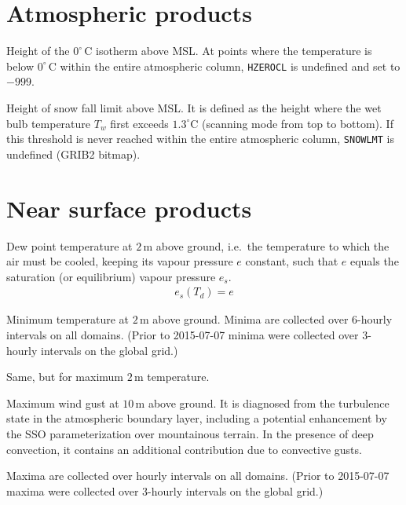 \section{Atmospheric products}
\begin{description}[leftmargin=3.0cm,style=sameline]
 \item [HZEROCL] Height of the $0^{\circ}\,\mathrm{C}$ isotherm above MSL. At points where the temperature is below 
                 $0^{\circ}\,\mathrm{C}$ within the entire atmospheric column, \texttt{HZEROCL} is undefined 
                 and set to $-999$.
 \item [SNOWLMT] Height of snow fall limit above MSL. It is defined as the height where the wet bulb 
                 temperature $T_{w}$ first exceeds $1.3^{\circ}\mathrm{C}$ (scanning mode from top to bottom). 
                 If this threshold is never reached within the entire atmospheric column, \texttt{SNOWLMT} 
                 is undefined (GRIB2 bitmap).
\end{description}


\section{Near surface products}
\begin{description}[leftmargin=3.0cm,style=sameline]
  \item[TD\_2M]     Dew point temperature at $2\,\mathrm{m}$ above ground, i.e.\ the temperature to which the 
                    air must be cooled, keeping its vapour pressure $e$ constant, such that $e$ equals the 
                    saturation (or equilibrium) vapour pressure $e_{s}$.
                    \begin{align*}
                      e_{s}(T_{d}) = e
                    \end{align*}
  \item [TMIN\_2M]  Minimum temperature at $2\,\mathrm{m}$ above ground. Minima are collected over $6$-hourly intervals 
                    on all domains. (Prior to 2015-07-07 minima were collected over $3$-hourly intervals on the 
                    global grid.)
  \item [TMAX\_2M]  Same, but for maximum $2\,\mathrm{m}$ temperature.
  \item [VMAX\_10M] Maximum wind gust at $10\,\mathrm{m}$ above ground. It is diagnosed from the turbulence state 
                    in the atmospheric boundary layer, including a potential enhancement by the SSO parameterization 
                    over mountainous terrain. In the presence of deep convection, it contains an additional contribution 
                    due to convective gusts. 
                    
                    Maxima are collected over hourly intervals on all domains. (Prior to 2015-07-07 maxima were collected 
                    over $3$-hourly intervals on the global grid.)
\end{description}



